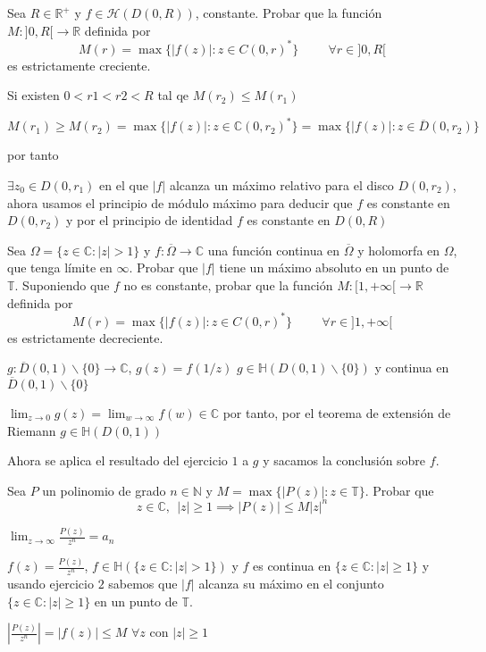 \begin{ejer}
	Sea $R\in\mathbb{R}^+$ y $f\in\mathcal{H}(D(0,R))$, constante.
	Probar que la función $M:]0,R[\rightarrow\mathbb{R}$ definida por
	$$ M(r) = \max\{ |f(z)| : z\in C(0,r)^{\ast} \} \hspace{1cm} \forall r\in ]0,R[ $$
	es estrictamente creciente.
\end{ejer}

\begin{sol}
Si existen $0<r1<r2<R$ tal qe $M(r_2) \leq M(r_1)$

$M(r_1) \geq M(r_2) = \max\{ |f(z)| : z\in\mathbb{C}(0,r_2)^{\ast} \} = \max\{ |f(z)| : z\in\overline{D}(0,r_2) \}$

por tanto

$\exists z_0 \in D(0,r_1)$ en el que $|f|$ alcanza un máximo relativo para el disco $D(0,r_2)$,
ahora usamos el principio de módulo máximo para deducir que 
$f$ es constante en $D(0,r_2)$ y por el principio de identidad
$f$ es constante en $D(0,R)$

\end{sol}

\begin{ejer}
	Sea $\Omega = \{ z\in\mathbb{C} : |z|>1 \}$ y $f:\overline{\Omega}\rightarrow\mathbb{C}$ una función continua en $\overline{\Omega}$ y holomorfa en $\Omega$, que tenga límite en $\infty$. 
	Probar que $|f|$ tiene un máximo absoluto en un punto de $\mathbb{T}$.
	Suponiendo que $f$ no es constante, probar que la función $M:[1,+\infty[\rightarrow\mathbb{R}$ definida por
	$$ M(r) = \max\{ |f(z)| : z\in C(0,r)^{\ast} \}  \hspace{1cm} \forall r\in ]1,+\infty[$$
	es estrictamente decreciente.
\end{ejer}
\begin{sol}

$g:\overline{D}(0,1)\backslash\{0\} \rightarrow \mathbb{C}$, $g(z) = f(1/z)$ 
$g\in\mathbb{H}(D(0,1)\backslash\{0\})$ y continua en $\overline{D}(0,1)\backslash\{0\}$

$\lim_{z\rightarrow0} g(z) = \lim_{w\rightarrow\infty} f(w) \in\mathbb{C}$ por tanto, por el teorema de extensión de Riemann
$g\in\mathbb{H}(D(0,1))$

Ahora se aplica el resultado del ejercicio $1$ a $g$ y sacamos la conclusión sobre $f$.
\end{sol}


\begin{ejer}
	Sea $P$ un polinomio de grado $n\in\mathbb{N}$ y $M = \max\{ |P(z)| : z\in\mathbb{T} \}$. Probar que
	$$ z\in\mathbb{C},\ \ |z|\geq 1 \implies |P(z)| \leq M|z|^n $$
\end{ejer}
\begin{sol}
$\lim_{z\rightarrow\infty} \frac{P(z)}{z^n} = a_n$

$f(z) = \frac{P(z)}{z^n}$, $f\in\mathbb{H}(\{ z\in\mathbb{C} : |z|>1 \})$ y $f$ es continua en $\{ z\in\mathbb{C} : |z|\geq 1 \}$
y usando ejercicio $2$ sabemos que
$|f|$ alcanza su máximo en el conjunto $\{ z\in\mathbb{C} : |z|\geq 1 \}$ en un punto de $\mathbb{T}$.

$\left| \frac{P(z)}{z^n} \right| = |f(z)| \leq M$ $\forall z$ con $|z|\geq 1$
\end{sol}


